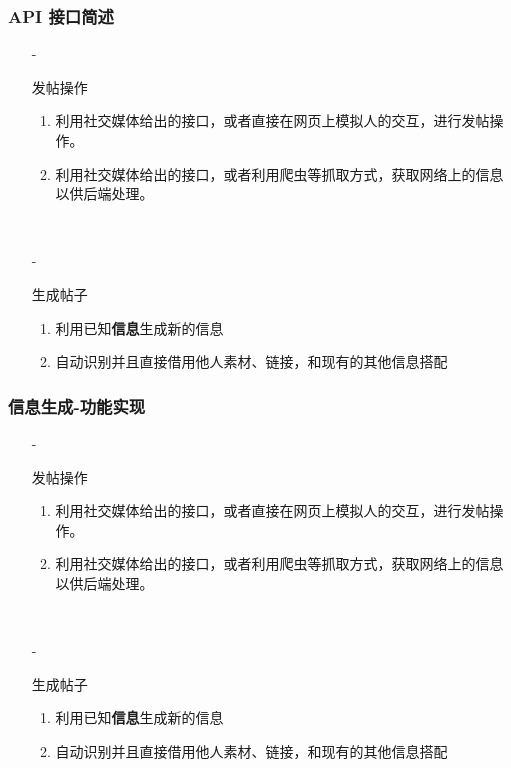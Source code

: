\documentclass[10pt]{beamer}
\begin{document}
    \begin{frame}
        \frametitle{API 接口简述}
        \begin{itemize}
            \item[-]{
                发帖操作
                \begin{enumerate}
                    \item 利用社交媒体给出的接口，或者直接在网页上模拟人的交互，进行发帖操作。
                    \item 利用社交媒体给出的接口，或者利用爬虫等抓取方式，获取网络上的信息以供后端处理。
                \end{enumerate}
                \hspace*{\fill}\\
                }
            \item[-]{
                生成帖子
                \begin{enumerate}
                    \item 利用已知\textbf{信息}生成新的信息
                    \item 自动识别并且直接借用他人素材、链接，和现有的其他信息搭配
                \end{enumerate}
                } 
        \end{itemize}
    \end{frame}

    \begin{frame}
        \frametitle{信息生成-功能实现}
        \begin{itemize}
            \item[-]{
                发帖操作
                \begin{enumerate}
                    \item 利用社交媒体给出的接口，或者直接在网页上模拟人的交互，进行发帖操作。
                    \item 利用社交媒体给出的接口，或者利用爬虫等抓取方式，获取网络上的信息以供后端处理。
                \end{enumerate}
                \hspace*{\fill}\\
                }
            \item[-]{
                生成帖子
                \begin{enumerate}
                    \item 利用已知\textbf{信息}生成新的信息
                    \item 自动识别并且直接借用他人素材、链接，和现有的其他信息搭配
                \end{enumerate}
                } 
        \end{itemize}
    \end{frame}
\end{document}
